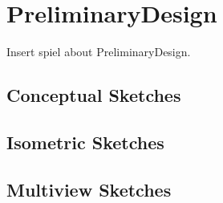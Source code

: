 \chapter{PreliminaryDesign}

Insert spiel about PreliminaryDesign.

\section{Conceptual Sketches}


\section{Isometric Sketches}


\section{Multiview Sketches}

